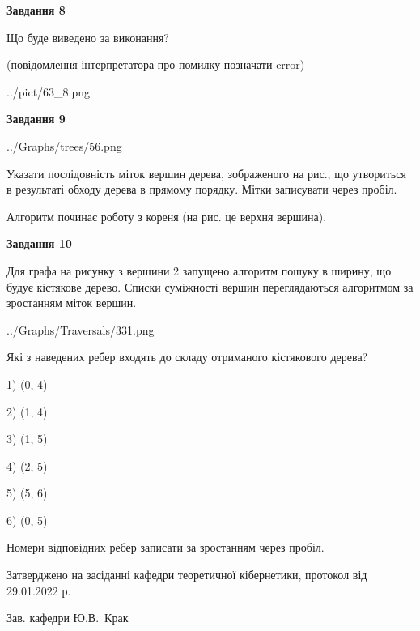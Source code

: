 \documentclass[12pt, ukrainian]{article}
\begin{document}
{\begin {large}
{\begin {center}\textbf{Завдання 8}\end {center}}\par
Що буде виведено за виконання?\par
 (повідомлення інтерпретатора про помилку позначати error)\par
\begin{center}
	{../pict/63_8.png}
\end{center}
\newpage

{\begin {center}\textbf{Завдання 9}\end {center}}\par

\begin{center}
	{../Graphs/trees/56.png}
\end{center}
Указати послідовність міток вершин дерева, зображеного на рис., що утвориться в результаті обходу дерева в прямому порядку. Мітки записувати через пробіл.\par Алгоритм починає роботу з кореня (на рис. це верхня вершина).\par
\newpage

{\begin {center}\textbf{Завдання 10}\end {center}}\par
Для графа на рисунку з вершини 2 запущено алгоритм пошуку в ширину, що будує кістякове дерево. Списки суміжності вершин переглядаються алгоритмом за зростанням міток вершин.\par
\begin{center}
	{../Graphs/Traversals/331.png}
\end{center}
\par Які з наведених ребер входять до складу отриманого кістякового дерева?\par
1) (0, 4)\par
2) (1, 4)\par
3) (1, 5)\par
4) (2, 5)\par
5) (5, 6)\par
6) (0, 5)\par
{\vskip 15pt} Номери відповідних ребер записати за зростанням через пробіл.\par
\newpage


\end {large}
}
{\smallskip \begin {small} Затверджено на засіданні кафедри теоретичної кібернетики, протокол  від   29.01.2022 р.\par\smallskip\smallskip
{\parbox {6.5 cm}{Зав. кафедри \dotfill Ю.В.~Крак}} \end{small}}
\end{document}
